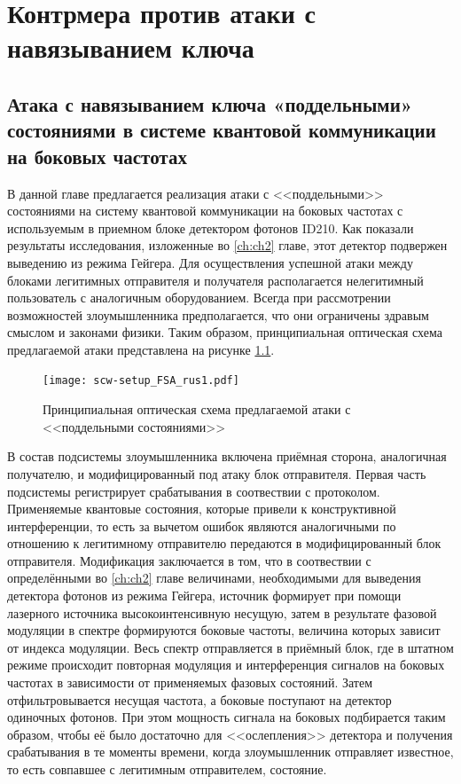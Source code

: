 \chapter{Контрмера против атаки с навязыванием ключа} \label{ch:ch3}


\section{Атака с навязыванием ключа «поддельными» состояниями в системе квантовой коммуникации на боковых частотах} \label{ch:ch3/sec1}

В данной главе предлагается реализация атаки с <<поддельными>> состояниями на систему квантовой коммуникации на боковых частотах с используемым в приемном блоке детектором фотонов ID210. Как показали результаты исследования, изложенные во \ref{ch:ch2} главе, этот детектор подвержен выведению из режима Гейгера. Для осуществления успешной атаки между блоками легитимных отправителя и получателя располагается нелегитимный пользователь с аналогичным оборудованием. Всегда при рассмотрении возможностей злоумышленника предполагается, что они ограничены здравым смыслом и законами физики. Таким образом, принципиальная оптическая схема предлагаемой атаки представлена на рисунке \ref{fig:SCW_FSA}. 

 \begin{figure}[ht]
  \centering
  \texttt{[image: scw-setup\_FSA\_rus1.pdf]}
  \caption{Принципиальная оптическая схема предлагаемой атаки с <<поддельными состояниями>>}
  \label{fig:SCW_FSA}
\end{figure}

В состав подсистемы злоумышленника включена приёмная сторона, аналогичная получателю, и модифицированный под атаку блок отправителя. Первая часть подсистемы регистрирует срабатывания в соотвествии с протоколом. Применяемые квантовые состояния, которые привели к конструктивной интерференции, то есть за вычетом ошибок являются аналогичными по отношению к легитимному отправителю передаются в модифицированный блок отправителя. Модификация заключается в том, что в соотвествии с определёнными во \ref{ch:ch2} главе величинами, необходимыми для выведения детектора фотонов из режима Гейгера, источник формирует при помощи лазерного источника высокоинтенсивную несущую, затем в результате фазовой модуляции в спектре формируются боковые частоты, величина которых зависит от индекса модуляции. Весь спектр отправляется в приёмный блок, где в штатном режиме происходит повторная модуляция и интерференция сигналов на боковых частотах в зависимости от применяемых фазовых состояний. Затем отфильтровывается несущая частота, а боковые поступают на детектор одиночных фотонов. При этом мощность сигнала на боковых подбирается таким образом, чтобы её было достаточно для <<ослепления>> детектора и получения срабатывания в те моменты времени, когда злоумышленник отправляет известное, то есть совпавшее с легитимным отправителем, состояние. 


